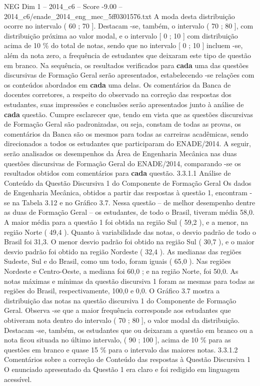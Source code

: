\begin{textsample}{NEG Dim 1 – 2014\_c6 – Score -9.00 – 2014\_c6/enade\_2014\_eng\_mec\_5ff0301576.txt}
A moda desta distribuição ocorre no intervalo ( 60 ; 70 ].
Destacam -se, também, o intervalo ( 70 ; 80 ], com distribuição próxima ao valor modal, e o intervalo [ 0 ; 10 ] com distribuição acima de 10 \% do total de notas, sendo que no intervalo [ 0 ; 10 ] incluem -se, além da nota zero, a frequência de estudantes que deixaram este tipo de questão em branco.
Na sequência, os resultados verificados para \textbf{cada} uma das questões discursivas de Formação Geral serão apresentados, estabelecendo -se relações com os conteúdos abordados em \textbf{cada} uma delas.
Os comentários da Banca de docentes corretores, a respeito do observado na correção das respostas dos estudantes, suas impressões e conclusões serão apresentados junto à análise de \textbf{cada} questão.
Cumpre esclarecer que, tendo em vista que as questões discursivas de Formação Geral são padronizadas, ou seja, constam de todas as provas, os comentários da Banca são os mesmos para todas as carreiras acadêmicas, sendo direcionados a todos os estudantes que participaram do ENADE/2014.
A seguir, serão analisados os desempenhos da Área de Engenharia Mecânica nas duas questões discursivas de Formação Geral do ENADE/2014, comparando -se os resultados obtidos com comentários para \textbf{cada} questão. 3.3.1.1 Análise de Conteúdo da Questão Discursiva 1 do Componente de Formação Geral Os dados de Engenharia Mecânica, obtidos a partir das respostas à questão 1, encontram -se na Tabela 3.12 e no Gráfico 3.7.
Nessa questão – de melhor desempenho dentre as duas de Formação Geral – os estudantes, de todo o Brasil, tiveram média 58,0.
A maior média para a questão 1 foi obtida na região Sul ( 59,2 ), e a menor, na região Norte ( 49,4 ).
Quanto à variabilidade das notas, o desvio padrão de todo o Brasil foi 31,3.
O menor desvio padrão foi obtido na região Sul ( 30,7 ), e o maior desvio padrão foi obtido na região Nordeste ( 32,4 ).
As medianas das regiões Sudeste, Sul e do Brasil, como um todo, foram iguais ( 65,0 ).
Nas regiões Nordeste e Centro-Oeste, a mediana foi 60,0 ; e na região Norte, foi 50,0.
As notas máximas e mínimas da questão discursiva 1 foram as mesmas para todas as regiões do Brasil, respectivamente, 100,0 e 0,0.
O Gráfico 3.7 mostra a distribuição das notas na questão discursiva 1 do Componente de Formação Geral.
Observa -se que a maior frequência corresponde aos estudantes que obtiveram nota dentro do intervalo ( 70 ; 80 ], o valor modal da distribuição.
Destacam -se, também, os estudantes que ou deixaram a questão em branco ou a nota ficou situada no último intervalo, ( 90 ; 100 ], acima de 10 \% para as questões em branco e quase 15 \% para o intervalo das maiores notas. 3.3.1.2 Comentários sobre a correção de Conteúdo das respostas à Questão Discursiva 1 O enunciado apresentado da Questão 1 era claro e foi redigido em linguagem acessível.

\end{textsample}
